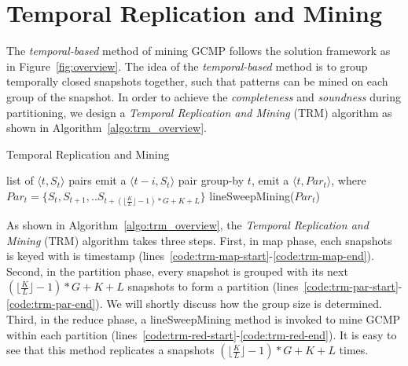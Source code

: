 \section{Temporal Replication and Mining}
\label{sec:trm_solution}
The \emph{temporal-based} method of mining GCMP follows the solution framework 
as in Figure~\ref{fig:overview}. The idea of the \emph{temporal-based} method 
is to group temporally closed snapshots together, such that patterns can be
mined on each group of the snapshot.
In order to achieve the \emph{completeness}
and \emph{soundness} during partitioning, we design a \emph{Temporal Replication
and Mining} (TRM) algorithm as shown in Algorithm~\ref{algo:trm_overview}.


\begin{algorithm}
\caption{Temporal Replication and Mining}
\label{algo:trm_overview}
\begin{algorithmic}[1]
\Require list of $\langle t, S_t \rangle$ pairs
\label{code:trm-map-start}
		\State emit a $\langle t-i, S_t \rangle$ pair
	\EndFor 
\EndFor
\label{code:trm-map-end}
\label{code:trm-par-start}
\State group-by $t$, emit a $\langle t, Par_t\rangle$,
\State  where $Par_t = \{S_t, S_{t+1}, .. S_{t+(\lfloor \frac{K}{L} \rfloor -1)*G+K+L}\} $
\EndFor
\label{code:trm-par-end}
\label{code:trm-red-start}
\State lineSweepMining($Par_t$)
\label{code:trm-red-end}
\EndFor
\end{algorithmic}
\end{algorithm}

As shown in Algorithm~\ref{algo:trm_overview}, the \emph{Temporal Replication and Mining} (TRM) algorithm takes
three steps. First, in map phase, each snapshots is keyed with is timestamp (lines~\ref{code:trm-map-start}-\ref{code:trm-map-end}). Second, in the partition phase, every snapshot is grouped with its next $(\lfloor \frac{K}{L} \rfloor -1)*G+K+L$ snapshots to form a partition (lines~\ref{code:trm-par-start}-\ref{code:trm-par-end}). We will shortly discuss how the group size is determined. Third, in the reduce phase, a lineSweepMining method is invoked to mine GCMP within each partition (lines~\ref{code:trm-red-start}-\ref{code:trm-red-end}). 
It is easy to see that this method replicates a snapshots $(\lfloor \frac{K}{L} \rfloor -1)*G+K+L$ times.

